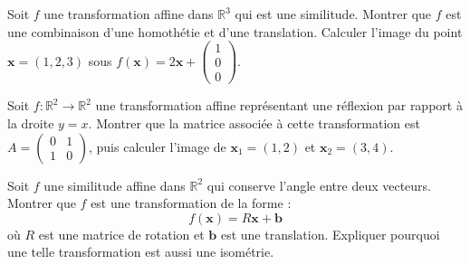 \begin{exercice}
Soit \( f \) une transformation affine dans \( \mathbb{R}^3 \) qui est une similitude. Montrer que \( f \) est une combinaison d'une homothétie et d'une translation. Calculer l'image du point \( \mathbf{x} = (1, 2, 3) \) sous \( f(\mathbf{x}) = 2 \mathbf{x} + \begin{pmatrix} 1 \\ 0 \\ 0 \end{pmatrix} \).
\end{exercice}

\begin{exercice}
Soit \( f : \mathbb{R}^2 \to \mathbb{R}^2 \) une transformation affine représentant une réflexion par rapport à la droite \( y = x \). Montrer que la matrice associée à cette transformation est \( A = \begin{pmatrix} 0 & 1 \\ 1 & 0 \end{pmatrix} \), puis calculer l'image de \( \mathbf{x}_1 = (1, 2) \) et \( \mathbf{x}_2 = (3, 4) \).
\end{exercice}

\begin{exercice}
Soit \( f \) une similitude affine dans \( \mathbb{R}^2 \) qui conserve l'angle entre deux vecteurs. Montrer que \( f \) est une transformation de la forme :
\[
f(\mathbf{x}) = R \mathbf{x} + \mathbf{b}
\]
où \( R \) est une matrice de rotation et \( \mathbf{b} \) est une translation. Expliquer pourquoi une telle transformation est aussi une isométrie.
\end{exercice}

